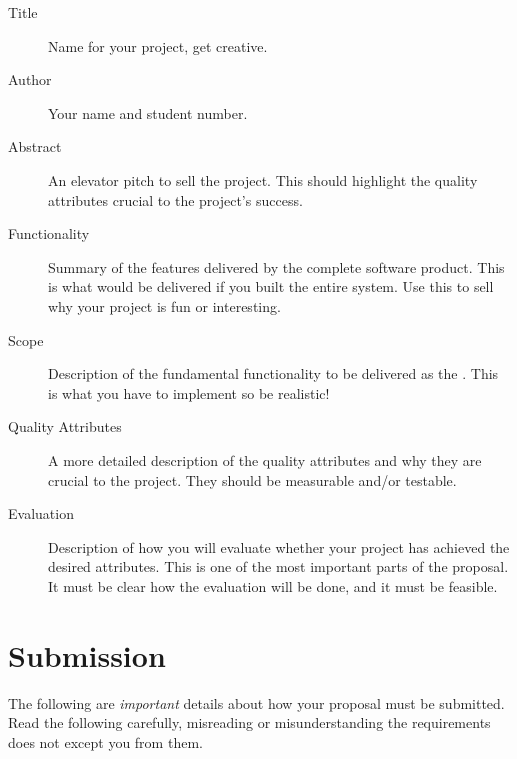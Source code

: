 \documentclass{csse4400}
\begin{document}
\begin{description}
    \item[Title] Name for your project, get creative.
    \item[Author] Your name and student number.
    \item[Abstract] An elevator pitch to sell the project. This should highlight the quality attributes crucial to the project's success.
    \item[Functionality] Summary of the features delivered by the complete software product. This is what would be delivered if you built the entire system.
                                    Use this to sell why your project is fun or interesting.
    \item[Scope] Description of the fundamental functionality to be delivered as the .
                         This is what you have to implement so be realistic!
    \item[Quality Attributes] A more detailed description of the quality attributes and why they are crucial to the project.
                                            They should be measurable and/or testable.
    \item[Evaluation] Description of how you will evaluate whether your project has achieved the desired attributes.
                                This is one of the most important parts of the proposal.
                                It must be clear how the evaluation will be done, and it must be feasible.
\end{description}


\section{Submission}

The following are \emph{important} details about how your proposal must be submitted.
Read the following carefully, misreading or misunderstanding the requirements does not except you from them.
\end{document}
